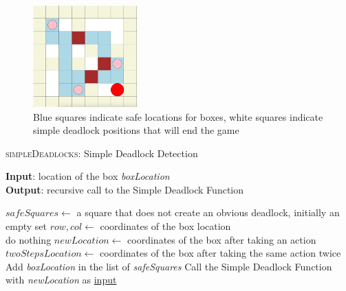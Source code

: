 \documentclass{article}
\begin{document}
\begin{figure}[htp]
        \centering
        \includegraphics[width=4cm]{Deadlock.png}
        \caption{Blue squares indicate safe locations for boxes, white squares indicate simple deadlock positions that will end the game}
    \end{figure} 

\begin{algorithm}
    \caption{\textsc{simpleDeadlocks}: Simple Deadlock Detection}\label{euclid}
    \hspace*{\algorithmicindent} \textbf{Input}: location of the box \emph{boxLocation} \\
    \hspace*{\algorithmicindent} \textbf{Output}: recursive call to the Simple Deadlock Function \\
    \begin{algorithmic}
    \State $safeSquares \gets$ a square that does not create an obvious deadlock, initially an empty set
    \State $row, col \gets$ coordinates of the box location \\
        \State do nothing
    \EndIf 
        \State $newLocation \gets$ coordinates of the box after taking an action 
        \State $twoStepsLocation \gets$ coordinates of the box after taking the same action twice \\
            \State Add \emph{boxLocation} in the list of \emph{safeSquares} %
            \State Call the Simple Deadlock Function with \emph{newLocation} as \underline{input}
        \EndIf
    \EndFor
    \end{algorithmic}
\end{algorithm}
\newpage
\newpage
\end{document}
